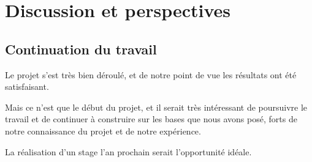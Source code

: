 \section{Discussion et perspectives}

\subsection{Continuation du travail}
Le projet s'est très bien déroulé, et de notre point de vue les résultats ont été satisfaisant.

Mais ce n'est que le début du projet, et il serait très intéressant de poursuivre le travail et de continuer à construire sur les bases que nous avons posé, forts de notre connaissance du projet et de notre expérience.

La réalisation d'un stage l'an prochain serait l'opportunité idéale.
